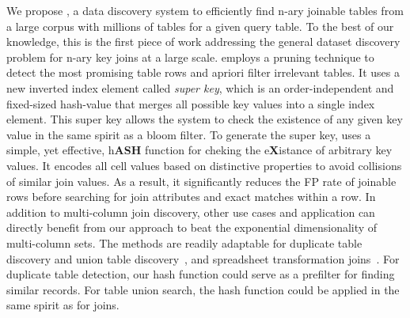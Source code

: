 We propose \system, a data discovery system to efficiently find n-ary joinable tables from a large corpus with millions of tables for a given query table.
To the best of our knowledge, this is the first piece of work addressing the general dataset discovery problem for n-ary key joins at a large scale.
\system employs a pruning technique to detect the most promising table rows and apriori filter irrelevant tables.
It uses a new inverted index element called \emph{super key}, which is an order-independent and fixed-sized hash-value that merges all possible key values into a single index element.
This super key allows the system to check the existence of any given key value in the same spirit as a bloom filter.
To generate the super key, \system uses \hash a simple, yet effective, h\textbf{ASH} function for cheking the e\textbf{X}istance of arbitrary key values. It encodes all cell values based on distinctive properties to avoid collisions of similar join values. As a result, it significantly reduces the FP rate of joinable rows before searching for join attributes and exact matches within a row. 
In addition to multi-column join discovery, other use cases and application can directly benefit from our approach to beat the exponential dimensionality of multi-column sets. The methods are readily adaptable for duplicate table discovery and union table discovery~\cite{lehmberg2017stitching, DBLP:journals/pvldb/CafarellaHK09, das2012finding, nargesian2018table, DBLP:conf/icde/BogatuFP020}, and spreadsheet transformation joins~\cite{DBLP:journals/pvldb/ZhuHC17}. For duplicate table detection, our hash function could serve as a prefilter for finding similar records. For table union search, the hash function could be applied in the same spirit as for joins.


